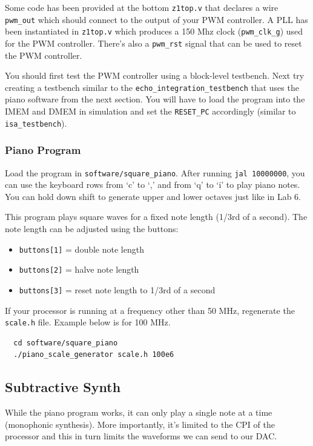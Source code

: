 \documentclass[11pt]{article}
\begin{document}
Some code has been provided at the bottom \verb|z1top.v| that declares a wire \verb|pwm_out| which should connect to the output of your PWM controller.
A PLL has been instantiated in \verb|z1top.v| which produces a 150 Mhz clock (\verb|pwm_clk_g|) used for the PWM controller.
There's also a \verb|pwm_rst| signal that can be used to reset the PWM controller.

You should first test the PWM controller using a block-level testbench.
Next try creating a testbench similar to the \verb|echo_integration_testbench| that uses the piano software from the next section.
You will have to load the program into the IMEM and DMEM in simulation and set the \verb|RESET_PC| accordingly (similar to \verb|isa_testbench|).

\subsubsection{Piano Program}
Load the program in \verb|software/square_piano|.
After running \verb|jal 10000000|, you can use the keyboard rows from `c' to `,' and from `q' to `i' to play piano notes.
You can hold down shift to generate upper and lower octaves just like in Lab 6.

This program plays square waves for a fixed note length (1/3rd of a second).
The note length can be adjusted using the buttons:
\begin{itemize}
  \item \verb|buttons[1]| = double note length
  \item \verb|buttons[2]| = halve note length
  \item \verb|buttons[3]| = reset note length to 1/3rd of a second
\end{itemize}

If your processor is running at a frequency other than 50 MHz, regenerate the \verb|scale.h| file. Example below is for 100 MHz.
\begin{verbatim}
  cd software/square_piano
  ./piano_scale_generator scale.h 100e6
\end{verbatim}

\subsection{Subtractive Synth}
While the piano program works, it can only play a single note at a time (monophonic synthesis).
More importantly, it's limited to the CPI of the processor and this in turn limits the waveforms we can send to our DAC.
\end{document}
